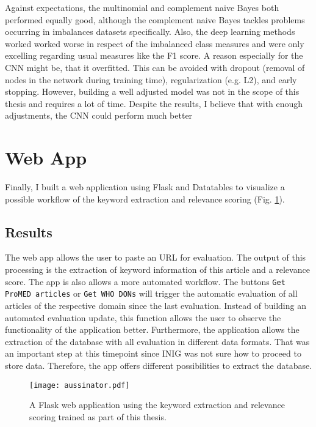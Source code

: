   Against expectations, the multinomial and complement naive Bayes both performed equally good, although the complement naive Bayes tackles problems occurring in imbalances datasets specifically.
  Also, the deep learning methods worked worked worse in respect of the imbalanced class measures and were only excelling regarding usual measures like the F1 score.
  A reason especially for the CNN might be, that it overfitted.
  This can be avoided with dropout (removal of nodes in the network during training time), regularization (e.g. L2), and early stopping.
  However, building a well adjusted model was not in the scope of this thesis and requires a lot of time.
  Despite the results, I believe that with enough adjustments, the CNN could perform much better

\section{Web App}
  Finally, I built a web application using Flask and Datatables to visualize a possible workflow of the keyword extraction and relevance scoring (Fig. \ref{fig:t-aussinator}).

\subsection{Results}
  The web app allows the user to paste an URL for evaluation.
  The output of this processing is the extraction of keyword information of this article and a relevance score.
  The app is also allows a more automated workflow. The buttons \texttt{Get ProMED articles} or \texttt{Get WHO DONs} will trigger the automatic evaluation of all articles of the respective domain since the last evaluation.
  Instead of building an automated evaluation update, this function allows the user to observe the functionality of the application better.
  Furthermore, the application allows the extraction of the database with all evaluation in different data formats.
  That was an important step at this timepoint since INIG was not sure how to proceed to store data.
  Therefore, the app offers different possibilities to extract the database.

  \begin{figure}
    \centering
    \texttt{[image: aussinator.pdf]}
    \caption{A Flask web application using the keyword extraction and relevance scoring trained as part of this thesis.}
  \label{fig:t-aussinator}
  \end{figure}

